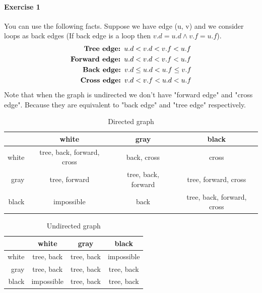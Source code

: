 \documentclass{book}
\begin{document}
	\paragraph{Exercise 1}
	You can use the following facts. Suppose we have edge (u, v) and we consider loops as back edges (If back edge is a loop then $v.d = u.d \land v.f = u.f$).
	\begin{align*}	
	\begin{split}
		\text{\textbf{Tree edge: }} u.d &< v.d < v.f < u.f \\
		\text{\textbf{Forward edge: }} u.d &< v.d < v.f < u.f \\
		\text{\textbf{Back edge: }} v.d &\le u.d < u.f \le v.f \\
		\text{\textbf{Cross edge: }} v.d &< v.f < u.d < u.f \\
	\end{split}
	\end{align*}
	Note that when the graph is undirected we don't have "forward edge" and "cross edge". Because they are equivalent to "back edge" and "tree edge" respectively.
	\begin{table}[h!]
		\centering
		\caption{Directed graph}
		\begin{tabular}{r|c|c|c}
			& white & gray & black \\
			\hline
			white & tree, back, forward, cross & back, cross & cross \\
			\hline
			gray & tree, forward  & tree, back, forward & tree, forward, cross \\
			\hline
			black & impossible & back & tree, back, forward, cross \\
		\end{tabular}
	\end{table}
	\begin{table}[h!]
		\centering
		\caption{Undirected graph}
		\begin{tabular}{r|c|c|c}
			& white & gray & black \\
			\hline
			white & tree, back & tree, back & impossible \\
			\hline
			gray & tree, back & tree, back & tree, back\\
			\hline
			black & impossible & tree, back & tree, back \\
		\end{tabular}
	\end{table}
	\FloatBarrier
\end{document}
